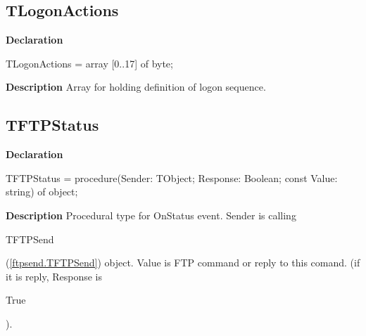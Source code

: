 \documentclass{report}
\newif\ifpdf
\begin{document}
\subsection*{TLogonActions}
\fi
\label{ftpsend-TLogonActions}
\begin{list}{}{
\setlength{\itemindent}{0cm}
\setlength{\listparindent}{0cm}
\setlength{\leftmargin}{\evensidemargin}
\addtolength{\leftmargin}{\tmplength}
\settowidth{\labelsep}{X}
\addtolength{\leftmargin}{\labelsep}
\setlength{\labelwidth}{\tmplength}
}
\item[\textbf{Declaration}\hfill]
\ifpdf
\begin{flushleft}
\fi
\begin{ttfamily}
TLogonActions = array [0..17] of byte;\end{ttfamily}

\ifpdf
\end{flushleft}
\fi

\par
\item[\textbf{Description}]
Array for holding definition of logon sequence.

\end{list}
\ifpdf
\subsection*{\large{\textbf{TFTPStatus}}\normalsize\hspace{1ex}\hrulefill}
\else
\subsection*{TFTPStatus}
\fi
\label{ftpsend-TFTPStatus}
\begin{list}{}{
\setlength{\itemindent}{0cm}
\setlength{\listparindent}{0cm}
\setlength{\leftmargin}{\evensidemargin}
\addtolength{\leftmargin}{\tmplength}
\settowidth{\labelsep}{X}
\addtolength{\leftmargin}{\labelsep}
\setlength{\labelwidth}{\tmplength}
}
\item[\textbf{Declaration}\hfill]
\ifpdf
\begin{flushleft}
\fi
\begin{ttfamily}
TFTPStatus = procedure(Sender: TObject; Response: Boolean; const Value: string) of object;\end{ttfamily}

\ifpdf
\end{flushleft}
\fi

\par
\item[\textbf{Description}]
Procedural type for OnStatus event. Sender is calling \begin{ttfamily}TFTPSend\end{ttfamily}(\ref{ftpsend.TFTPSend}) object. Value is FTP command or reply to this comand. (if it is reply, Response is \begin{ttfamily}True\end{ttfamily}).

\end{list}
\end{document}
